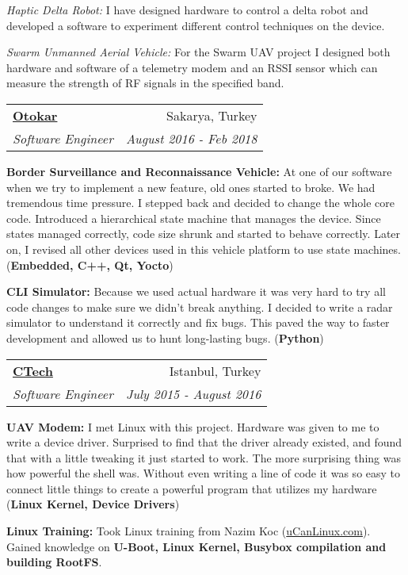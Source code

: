 \documentclass[letterpaper,11pt]{article}
\makeatletter
\newcommand{\resumeSubheading}[4]{
\vspace{-1pt}\item
	\begin{tabular*}{0.97\textwidth}{l@{\extracolsep{\fill}}r}
		\textbf{#1} & #2 \\
		\textit{\small#3} & \textit{\small #4} \\
	\end{tabular*}
}
\makeatother
\begin{document}
	\textit{Haptic Delta Robot:}
	  I have designed hardware to control a delta robot and developed a software
	  to experiment different control techniques on the device.


	\textit{Swarm Unmanned Aerial Vehicle:}
	For the Swarm UAV project I designed both hardware and software of a telemetry
	modem and an RSSI sensor which can measure the strength of RF signals in the specified band.

    \resumeSubheading
      {\href{https://www.otokar.com/en-us/Pages/default.aspx}{Otokar}}{Sakarya, Turkey}
      {Software Engineer}{August 2016 - Feb 2018}
      
      
	\vspace{2pt}
	\textbf{Border Surveillance and Reconnaissance Vehicle:}
	At one of our software when we try to implement a new
	feature, old ones started to broke. We had tremendous time pressure.
	I stepped back and decided to change the whole core code.
	Introduced a hierarchical state machine that manages the device.
	Since states managed correctly, code size shrunk and started to behave correctly.
	Later on, I revised all other devices used in this vehicle platform to use state machines.
	(\textbf{Embedded, C++, Qt, Yocto})


	\textbf{CLI Simulator:}
	Because we used actual hardware it was very hard to try all code changes to make sure we didn’t break anything.
	I decided to write a radar simulator to understand it correctly and fix bugs.
	This paved the way to faster development and allowed us to hunt long-lasting bugs. 
	(\textbf{Python})
	

    \resumeSubheading
      {\href{https://www.ctech.com.tr/}{CTech}}{Istanbul, Turkey}
      {Software Engineer}{July 2015 - August 2016}


	\vspace{2pt}
	\textbf{UAV Modem:}
	I met Linux with this project. Hardware was given to me to write a device driver. Surprised to
	find that the driver already existed, and found that with a little tweaking it just started to work.
	The more surprising thing was how powerful the shell was.
	Without even writing a line of code it was so easy to connect little things to create a powerful program that utilizes my hardware 
	(\textbf{Linux Kernel, Device Drivers})

	  
	\textbf{Linux Training:}
	Took Linux training from Nazim Koc (\href{http://ucanlinux.com}{uCanLinux.com}). Gained knowledge on \textbf{U-Boot, Linux Kernel, Busybox compilation and building RootFS}.
\end{document}
